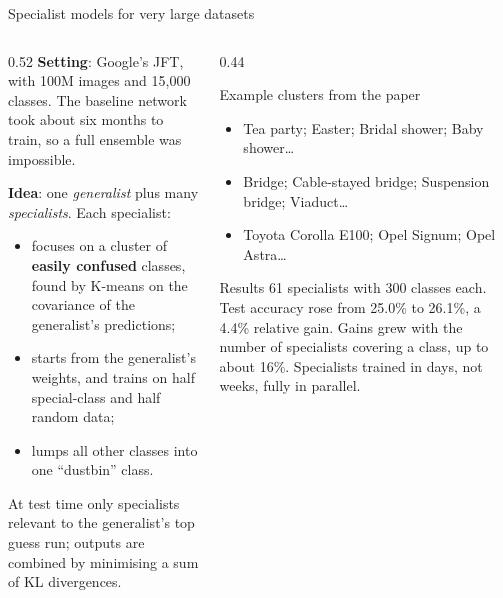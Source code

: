 \documentclass[aspectratio=169,11pt]{beamer}
\begin{document}
\begin{frame}{Specialist models for very large datasets}
  \begin{columns}[T]
    \begin{column}{0.52\textwidth}
      \small
      \textbf{Setting}: Google's JFT, with 100M images and 15,000 classes. The baseline network took about six months to train, so a full ensemble was impossible.
      \vspace{1mm}

      \textbf{Idea}: one \emph{generalist} plus many \emph{specialists}. Each specialist:
      \begin{itemize}
        \item focuses on a cluster of \textbf{easily confused} classes, found by K-means on the covariance of the generalist's predictions;
        \item starts from the generalist's weights, and trains on half special-class and half random data;
        \item lumps all other classes into one ``dustbin'' class.
      \end{itemize}
      At test time only specialists relevant to the generalist's top guess run; outputs are combined by minimising a sum of KL divergences.
    \end{column}
    \begin{column}{0.44\textwidth}
      \begin{exampleblock}{Example clusters from the paper}
        \scriptsize
        \begin{itemize}
          \item Tea party; Easter; Bridal shower; Baby shower\ldots
          \item Bridge; Cable-stayed bridge; Suspension bridge; Viaduct\ldots
          \item Toyota Corolla E100; Opel Signum; Opel Astra\ldots
        \end{itemize}
      \end{exampleblock}
      \begin{block}{Results}
        \small
        61 specialists with 300 classes each. Test accuracy rose from 25.0\% to 26.1\%, a 4.4\% relative gain. Gains grew with the number of specialists covering a class, up to about 16\%. Specialists trained in days, not weeks, fully in parallel.
      \end{block}
    \end{column}
  \end{columns}
\end{frame}
\end{document}
